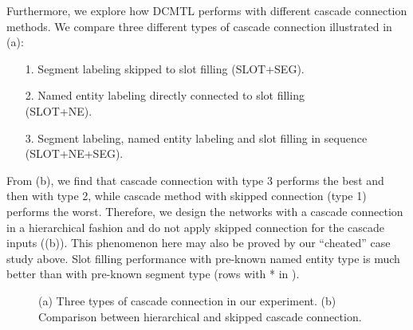 Furthermore, 
we explore how DCMTL performs with different cascade connection methods.
We compare three different types of cascade connection 
illustrated in (a):
\begin{enumerate}
\item[1.]
	Segment labeling skipped to slot filling (SLOT+SEG).
\item[2.]
	Named entity labeling directly connected to slot filling \\(SLOT+NE).
\item[3.]
	Segment labeling, named entity labeling and slot filling in sequence (SLOT+NE+SEG).
\end{enumerate}

From (b),
we find that cascade connection with type 3 
performs the best
and then with type 2,
while cascade method with skipped connection (type 1) performs the worst.
Therefore, we design the networks 
with a cascade connection in a hierarchical fashion
and do not apply skipped connection for the cascade 
inputs ((b)).
This phenomenon here may also be proved by our ``cheated'' case study above.
Slot filling performance with pre-known named entity type is 
much better than with pre-known segment type
(rows with * in ).
\begin{figure}[h]
	\centering
	\caption{(a) Three types of cascade connection in our experiment.
		(b) Comparison between hierarchical and skipped cascade connection.}
	\label{fig:cascade_connection_type}
\end{figure}
